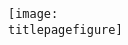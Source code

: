 \begin{titlepage}
\centering
    \Large
    \organizationname\\
    \vspace{2cm}
    
    \LARGE
    \textbf{\maintitle}
    \vspace {0.5cm}
    
    \Large
    \subtitle
    \vspace*{2cm}
    \texttt{[image: \\titlepagefigure]}
    
    \vfill
    
    \Large
    \coursename\\
    
    \textbf{\dateline}\\
    
    \vspace*{1cm}
    
    \small{}
    
    
\end{titlepage}

